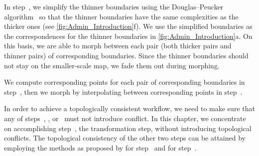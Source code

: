 In step~, we simplify the thinner boundaries using
the Douglas--Peucker algorithm~\parencite{Douglas1973} 
so that the thinner boundaries 
have the same complexities as the thicker ones 
(see \fig\ref{fig:Admin_Introduction}f). 
We use the simplified boundaries as the correspondences for 
the thinner boundaries in \fig\ref{fig:Admin_Introduction}a. 
On this basis, we are able to morph between
each pair (both thicker pairs and thinner pairs) of 
corresponding boundaries.
Since the thinner boundaries should not stay
on the smaller-scale map, 
we fade them out during morphing. 

We compute corresponding points 
for each pair of corresponding boundaries in step~,
then we morph by interpolating between corresponding points 
in step~.

In order to achieve a topologically consistent workflow, 
we need to make sure that any of
steps~, , or~
must not introduce conflict.
In this chapter, we concentrate on accomplishing 
step~, the transformation step, 
without introducing topological conflicts.  
The topological consistency of the other two steps 
can be attained by employing the methods as proposed by
\textcite{Saalfeld1999} for step~ and 
\textcite{GotsmanS2001} for step~.

